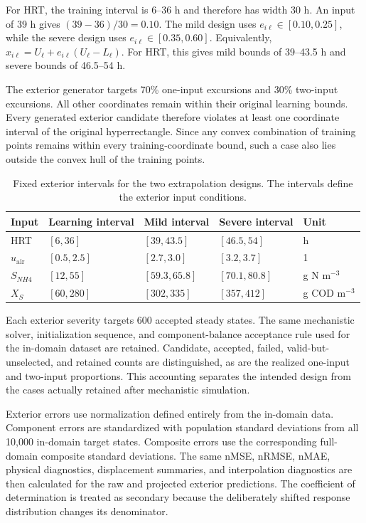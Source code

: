 For HRT, the training interval is 6--36 h and therefore has width 30 h. An input of 39 h gives
$(39-36)/30=0.10$.
The mild design uses
$e_{i\ell}\in[0.10,0.25]$,
while the severe design uses
$e_{i\ell}\in[0.35,0.60]$.
Equivalently,
$x_{i\ell}=U_\ell+e_{i\ell}(U_\ell-L_\ell)$.
For HRT, this gives mild bounds of 39--43.5 h and severe bounds of 46.5--54 h.

The exterior generator targets 70\% one-input excursions and 30\% two-input excursions. All other coordinates remain within their original learning bounds. Every generated exterior candidate therefore violates at least one coordinate interval of the original hyperrectangle. Since any convex combination of training points remains within every training-coordinate bound, such a case also lies outside the convex hull of the training points.

\begin{table}[htbp]
\centering
\caption{Fixed exterior intervals for the two extrapolation designs. The intervals define the exterior input conditions.}
\label{tab:reactor_extrapolation_domain}
\small
\begin{tabular}{lllll}
\toprule
Input & Learning interval & Mild interval & Severe interval & Unit\\
\midrule
HRT & $[6,36]$ & $[39,43.5]$ & $[46.5,54]$ & h\\
$u_{\mathrm{air}}$ & $[0.5,2.5]$ & $[2.7,3.0]$ & $[3.2,3.7]$ & 1\\
$S_{NH4}$ & $[12,55]$ & $[59.3,65.8]$ & $[70.1,80.8]$ & g N m$^{-3}$\\
$X_S$ & $[60,280]$ & $[302,335]$ & $[357,412]$ & g COD m$^{-3}$\\
\bottomrule
\end{tabular}
\end{table}

Each exterior severity targets 600 accepted steady states. The same mechanistic solver, initialization sequence, and component-balance acceptance rule used for the in-domain dataset are retained. Candidate, accepted, failed, valid-but-unselected, and retained counts are distinguished, as are the realized one-input and two-input proportions. This accounting separates the intended design from the cases actually retained after mechanistic simulation.

Exterior errors use normalization defined entirely from the in-domain data. Component errors are standardized with population standard deviations from all 10,000 in-domain target states. Composite errors use the corresponding full-domain composite standard deviations. The same nMSE, nRMSE, nMAE, physical diagnostics, displacement summaries, and interpolation diagnostics are then calculated for the raw and projected exterior predictions. The coefficient of determination is treated as secondary because the deliberately shifted response distribution changes its denominator.

